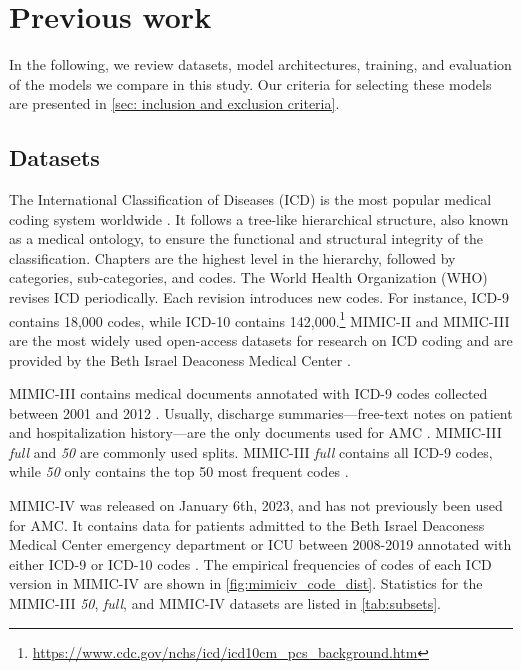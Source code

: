 {\section{Previous work}

In the following, we review datasets, model architectures, training, and evaluation of the models we compare in this study. Our criteria for selecting these models are presented in \cref{sec: inclusion and exclusion criteria}.

\subsection{Datasets}
\label{sec:dataset}
The International Classification of Diseases (ICD) is the most popular medical coding system worldwide \parencite{tengReviewDeepNeural2022}. It follows a tree-like hierarchical structure, also known as a medical ontology, to ensure the functional and structural integrity of the classification. Chapters are the highest level in the hierarchy, followed by categories, sub-categories, and codes. The World Health Organization (WHO) revises ICD periodically. Each revision introduces new codes. For instance, ICD-9 contains 18,000 codes, while ICD-10 contains 142,000.\footnote{\url{https://www.cdc.gov/nchs/icd/icd10cm_pcs_background.htm}} MIMIC-II and MIMIC-III are the most widely used open-access datasets for research on ICD coding and are provided by the Beth Israel Deaconess Medical Center \parencite{tengReviewDeepNeural2022, johnsonMIMICIIIFreelyAccessible2016, leeOpenaccessMIMICIIDatabase2011}. 
 
MIMIC-III contains medical documents annotated with ICD-9 codes collected between 2001 and 2012 \parencite{johnsonMIMICIIIFreelyAccessible2016}. Usually, discharge summaries---free-text notes on patient and hospitalization history---are the only documents used for AMC \parencite{tengReviewDeepNeural2022}. MIMIC-III \textit{full} and \textit{50} are commonly used splits. MIMIC-III \textit{full} contains all ICD-9 codes, while \textit{50} only contains the top 50 most frequent codes \parencite{mullenbachExplainablePredictionMedical2018, shiAutomatedICDCoding2018}. 

MIMIC-IV was released on January 6th, 2023, and has not previously been used for AMC. It contains data for patients admitted to the Beth Israel Deaconess Medical Center emergency department or ICU between 2008-2019  annotated with either ICD-9 or ICD-10 codes \parencite{johnsonMIMICIVFreelyAccessible2023}. The empirical frequencies of codes of each ICD version in MIMIC-IV are shown in \cref{fig:mimiciv_code_dist}.  
Statistics for the MIMIC-III \textit{50}, \textit{full}, and MIMIC-IV datasets are listed in \cref{tab:subsets}.


}
